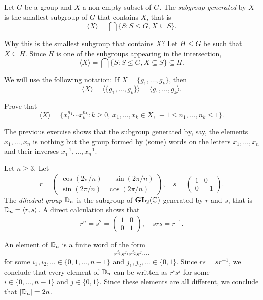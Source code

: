 \begin{definition}
        Let $G$ be a group and $X$ a non-empty 
        subset of $G$. The \emph{subgroup
        generated} by $X$ is the smallest subgroup of $G$ that contains
        $X$, that is 
        \[
            \langle X\rangle=\bigcap\{S:S\leq G,X\subseteq S\}.
        \]
\end{definition}

Why this is the smallest subgroup that contains $X$? 
Let $H\leq G$ be such that 
$X\subseteq H$. Since $H$ is one of the subgroups appearing
in the intersection, 
\[
        \langle X\rangle=\bigcap\{S:S\leq G,X\subseteq S\}\subseteq H.        
\]

We will use the following notation:
If $X=\{g_1,\dots,g_k\}$, then 
\[
\langle
X\rangle=\langle\{g_1,\dots,g_k\}\rangle=\langle g_1,\dots,g_k\rangle.
\]

\begin{exercise}
\label{xca:generated}
Prove that 
\[
    \langle X\rangle=\{x_1^{n_1}\cdots x_k^{n_k}:k\geq0,\,x_1,\dots,x_k\in X,\,-1\leq n_1,\dots,n_k\leq 1\}.
\]
\end{exercise}

The previous exercise shows that
the subgroup generated by, say, the elements 
$x_1,\dots,x_n$ is nothing but the 
group formed by (some) words on the letters 
$x_1,\dots,x_n$ and their inverses 
$x_1^{-1},\dots,x_n^{-1}$. 

\begin{example}
Let $n\geq3$. Let 
\[
r=\begin{pmatrix}
\cos(2\pi/n) & -\sin(2\pi/n)\\
\sin(2\pi/n) & \cos(2\pi/n)
\end{pmatrix},
\quad
s=\begin{pmatrix}
        1 & 0\\
        0 & -1
\end{pmatrix}.
\]
The \emph{dihedral group} $\mathbb{D}_n$ is the subgroup of
$\mathbf{GL}_2(\mathbb{C})$ generated by $r$ and $s$,
that is $\mathbb{D}_n=\langle r,s\rangle$. A direct calculation shows that 
\[
r^n=s^2=\begin{pmatrix}
        1&0\\
        0&1
\end{pmatrix},
\quad
srs=r^{-1}.
\]

An element of $\mathbb{D}_n$ is a finite word of the form 
\[
r^{i_1}s^{j_1}r^{i_2}s^{j_2}\cdots
\]
for some 
 $i_1,i_2,\dots\in\{0,1,\dots,n-1\}$ and 
$j_1,j_2,\dots\in\{0,1\}$. Since $rs=sr^{-1}$, we conclude that
every element of $\mathbb{D}_n$ can be written as $r^is^j$ 
for some $i\in\{0,\dots,n-1\}$ and $j\in\{0,1\}$. Since these elements are all different, we conclude that 
$|\mathbb{D}_n|=2n$.
\end{example}

